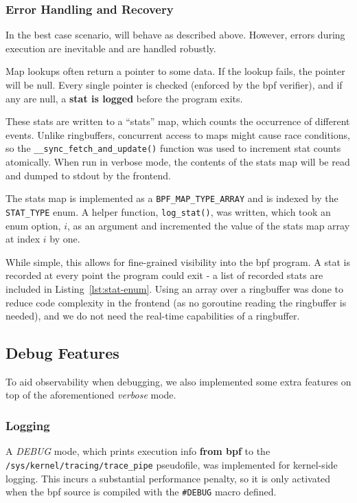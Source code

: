 \subsubsection{Error Handling and Recovery}\label{subsubsec:err-handling}

In the best case scenario, \af will behave as described above. However, errors
during execution are inevitable and are handled robustly. 

Map lookups often return a pointer to some data. If the lookup fails, the
pointer will be null. Every single pointer is checked (enforced by the \ac{bpf}
verifier), and if any are null, a \textbf{stat is logged} before the program
exits.

These stats are written to a ``stats'' map, which counts the occurrence of
different events. Unlike ringbuffers, concurrent access to maps might cause race
conditions, so the \texttt{\_\_sync\_fetch\_and\_update()} function was used to
increment stat counts atomically. When run in verbose mode, the contents of the
stats map will be read and dumped to \ac{stdout} by the frontend.

The stats map is implemented as a \texttt{BPF\_MAP\_TYPE\_ARRAY} and is indexed
by the \texttt{STAT\_TYPE} enum. A helper function, \texttt{log\_stat()}, was
written, which took an enum option, $i$, as an argument and incremented the value
of the stats map array at index $i$ by one.

While simple, this allows for fine-grained visibility into the \ac{bpf} program.
A stat is recorded at every point the program could exit - a list of recorded
stats are included in Listing~\ref{lst:stat-enum}. Using an array over a
ringbuffer was done to reduce code complexity in the frontend (as no goroutine
reading the ringbuffer is needed), and we do not need the real-time capabilities
of a ringbuffer.

\subsection{Debug Features}

To aid observability when debugging, we also implemented some extra features
on top of the aforementioned \textit{verbose} mode.

\subsubsection{Logging}

A \textit{DEBUG} mode,
which prints execution info \textbf{from \ac{bpf}} to the
\texttt{/sys/kernel/tracing/trace\_pipe} pseudofile, was implemented for
kernel-side logging. This incurs a substantial performance penalty, so it is only
activated when the \ac{bpf} source is compiled with the \texttt{\#DEBUG} macro
defined.

